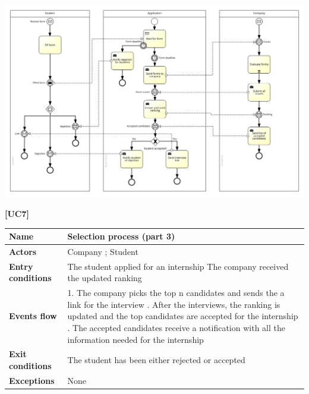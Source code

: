 \documentclass[11pt,twoside]{article}
\begin{document}
\begin{center}
\includegraphics[width=\textwidth]{Images/UC6}
\end{center}

\newpage

\large{\textbf{[UC7]}} \\
\begin{table}[H]
\begin{tabular}{| p{} | p{} |}
\hline
\textbf{Name}
& Selection process (part 3) \\
\hline
\textbf{Actors}
& Company ; Student \\
\hline
\textbf{Entry conditions}
& The student applied for an internship \newline
The company received the updated ranking \\
\hline
\textbf{Events flow}
& 1. The company picks the top n candidates and sends the a link for the interview \newline
2. After the interviews, the ranking is updated and the top candidates are accepted for the internship \newline
3. The accepted candidates receive a notification with all the information needed for the internship \\
\hline
\textbf{Exit conditions}
& The student has been either rejected or accepted \\
\hline
\textbf{Exceptions}
& None \\
\hline
\end{tabular}
\end{table}
\end{document}
